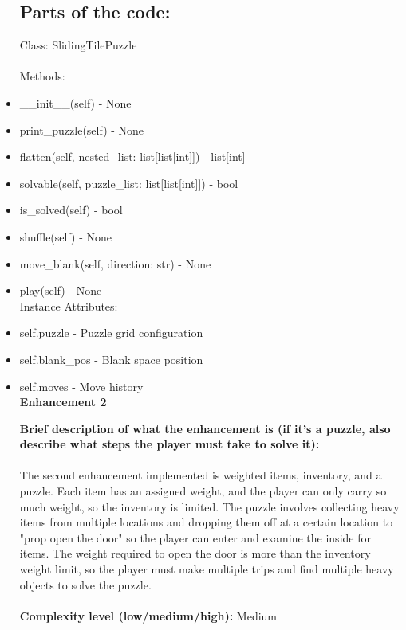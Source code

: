 \documentclass[11pt]{article}
\begin{document}
\begin{itemize}
\subsection{\textbf{Parts of the code:}}

   Class: SlidingTilePuzzle \\\\
   Methods:
   \item \_\_init\_\_(self) - None
   \item print\_puzzle(self) - None
   \item flatten(self, nested\_list: list[list[int]]) - list[int]
   \item solvable(self, puzzle\_list: list[list[int]]) - bool
   \item is\_solved(self) - bool
   \item shuffle(self) - None
   \item move\_blank(self, direction: str) - None
   \item play(self) - None\\

     Instance Attributes:
   \item self.puzzle - Puzzle grid configuration
   \item self.blank\_pos - Blank space position
   \item self.moves - Move history\\


    \textbf{Enhancement 2} \\
    \begin{itemize}
        \textbf{Brief description of what the enhancement is (if it’s a puzzle, also describe what steps the player must take to solve it):}\\\\

The second enhancement implemented is weighted items, inventory, and a puzzle. Each item has an assigned weight, and the player can only carry so much weight, so the inventory is limited. The puzzle involves collecting heavy items from multiple locations and dropping them off at a certain location to "prop open the door" so the player can enter and examine the inside for items. The weight required to open the door is more than the inventory weight limit, so the player must make multiple trips and find multiple heavy objects to solve the puzzle.\\\\

         \textbf{Complexity level (low/medium/high):} Medium\\\\


\end{itemize}
\end{itemize}
\end{document}
